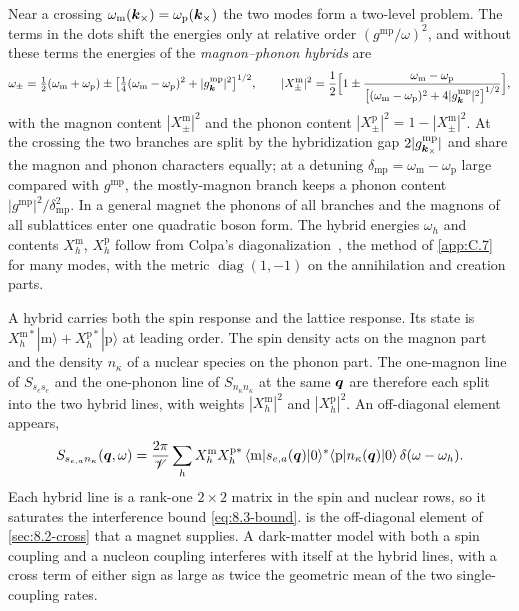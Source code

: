 Near a crossing $\omega_{\mathrm{m}}(\bm{k}_\times) = \omega_{\mathrm{p}}(\bm{k}_\times)$ the two modes form a two-level problem. The terms in the dots shift the energies only at relative order $(g^{\mathrm{mp}}/\omega)^2$, and without these terms the energies of the \emph{magnon--phonon hybrids} are
\begin{equation}
  \omega_\pm = \tfrac12(\omega_{\mathrm{m}} + \omega_{\mathrm{p}}) \pm \bigl[\tfrac14(\omega_{\mathrm{m}} - \omega_{\mathrm{p}})^2 + |g^{\mathrm{mp}}_{\bm{k}}|^2\bigr]^{1/2} , \qquad
  |X^{\mathrm{m}}_\pm|^2 = \frac12\Bigl[1 \pm \frac{\omega_{\mathrm{m}} - \omega_{\mathrm{p}}}{\bigl[(\omega_{\mathrm{m}} - \omega_{\mathrm{p}})^2 + 4|g^{\mathrm{mp}}_{\bm{k}}|^2\bigr]^{1/2}}\Bigr] ,
  \label{eq:14.2-hyb}
\end{equation}
with the magnon content $|X^{\mathrm{m}}_\pm|^2$ and the phonon content $|X^{\mathrm{p}}_\pm|^2 = 1 - |X^{\mathrm{m}}_\pm|^2$. At the crossing the two branches are split by the hybridization gap $2|g^{\mathrm{mp}}_{\bm{k}_\times}|$ and share the magnon and phonon characters equally; at a detuning $\delta_{\mathrm{mp}} = \omega_{\mathrm{m}} - \omega_{\mathrm{p}}$ large compared with $g^{\mathrm{mp}}$, the mostly-magnon branch keeps a phonon content $|g^{\mathrm{mp}}|^2/\delta_{\mathrm{mp}}^2$. In a general magnet the phonons of all branches and the magnons of all sublattices enter one quadratic boson form. The hybrid energies $\omega_h$ and contents $X^{\mathrm{m}}_h$, $X^{\mathrm{p}}_h$ follow from Colpa's diagonalization~\cite{colpa1978diagonalization}, the method of \cref{app:C.7} for many modes, with the metric $\operatorname{diag}(1, -1)$ on the annihilation and creation parts.

A hybrid carries both the spin response and the lattice response. Its state is $X^{\mathrm{m}*}_h|{\mathrm{m}}\rangle + X^{\mathrm{p}*}_h|{\mathrm{p}}\rangle$ at leading order. The spin density acts on the magnon part and the density $n_\kappa$ of a nuclear species on the phonon part. The one-magnon line of $S_{s_e s_e}$ and the one-phonon line of $S_{n_\kappa n_\kappa}$ at the same $\bm{q}$ are therefore each split into the two hybrid lines, with weights $|X^{\mathrm{m}}_h|^2$ and $|X^{\mathrm{p}}_h|^2$. An off-diagonal element appears,
\begin{equation}
  S_{s_{e,a}n_\kappa}(\bm{q},\omega) = \frac{2\pi}{\mathscr{V}}\sum_h X^{\mathrm{m}}_hX^{\mathrm{p}*}_h\,\langle{\mathrm{m}}|s_{e,a}(\bm{q})|0\rangle^*\langle{\mathrm{p}}|n_\kappa(\bm{q})|0\rangle\,\delta(\omega - \omega_h) .
  \label{eq:14.2-Ssn}
\end{equation}
Each hybrid line is a rank-one $2\times2$ matrix in the spin and nuclear rows, so it saturates the interference bound \cref{eq:8.3-bound}.  is the off-diagonal element of \cref{sec:8.2-cross} that a magnet supplies. A dark-matter model with both a spin coupling and a nucleon coupling interferes with itself at the hybrid lines, with a cross term of either sign as large as twice the geometric mean of the two single-coupling rates.

